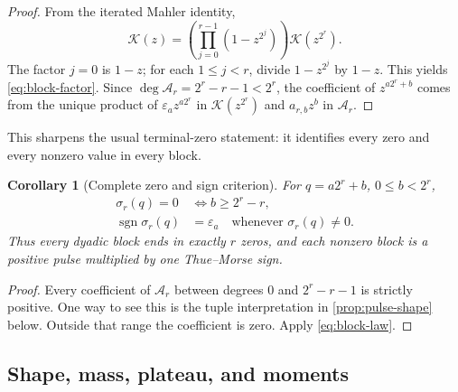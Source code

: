 \documentclass[11pt]{article}
\newtheorem{corollary}[theorem]{Corollary}
\theoremstyle{definition}
\theoremstyle{remark}
\newcommand{\eps}{\varepsilon}
\newcommand{\K}{\mathcal K}
\newcommand{\A}{\mathcal A}
\begin{document}
\begin{proof}
From the iterated Mahler identity,
\[
 \K(z)=\left(\prod_{j=0}^{r-1}(1-z^{2^j})\right)\K(z^{2^r}).
\]
The factor \(j=0\) is \(1-z\); for each \(1\leq j<r\), divide
\(1-z^{2^j}\) by \(1-z\).  This yields \cref{eq:block-factor}.
Since \(\deg\A_r=2^r-r-1<2^r\), the coefficient of
\(z^{a2^r+b}\) comes from the unique product of \(\eps_a z^{a2^r}\)
in \(\K(z^{2^r})\) and \(a_{r,b}z^b\) in \(\A_r\).
\end{proof}

This sharpens the usual terminal-zero statement: it identifies every zero
and every nonzero value in every block.

\begin{corollary}[Complete zero and sign criterion]
For \(q=a2^r+b\), \(0\leq b<2^r\),
\begin{align}
 \sigma_r(q)=0
 &\iff b\geq2^r-r,                                        \label{eq:zero-criterion}\\
 \operatorname{sgn}\sigma_r(q)
 &=\eps_a\quad\text{whenever }\sigma_r(q)\ne0.            \label{eq:sign-criterion}
\end{align}
Thus every dyadic block ends in exactly \(r\) zeros, and each nonzero block
is a positive pulse multiplied by one Thue--Morse sign.
\end{corollary}

\begin{proof}
Every coefficient of \(\A_r\) between degrees \(0\) and
\(2^r-r-1\) is strictly positive.  One way to see this is the tuple
interpretation in \cref{prop:pulse-shape} below.  Outside that range the
coefficient is zero.  Apply \cref{eq:block-law}.
\end{proof}

\subsection{Shape, mass, plateau, and moments}
\end{document}
